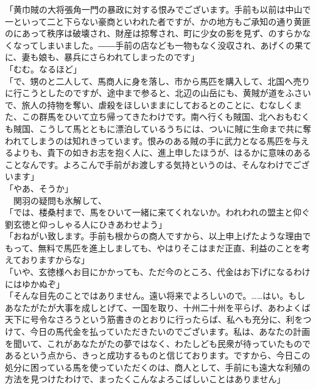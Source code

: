 \documentclass[
  paper=a5,
  fontsize=10pt,
  jafontsize=9.5pt,
  tate,                  %
  open_bracket_pos=nibu, %
]{jlreq}
\begin{document}
「黄巾賊の大将張角一門の暴政に対する恨みでございます。手前も以前は中山で一といって二と下らない豪商といわれた者ですが、かの地方もご承知の通り黄匪のにあって秩序は破壊され、財産は掠奪され、町に少女の影を見ず、のすらかなくなってしまいました。――手前の店なども一物もなく没収され、あげくの果てに、妻も娘も、暴兵にさらわれてしまったのです」\\


「むむ。なるほど」\\


「で、甥のと二人して、馬商人に身を落し、市から馬匹を購入して、北国へ売りに行こうとしたのですが、途中まで参ると、北辺の山岳にも、黄賊が道をふさいで、旅人の持物を奪い、虐殺をほしいままにしておるとのことに、むなしくまた、この群馬をひいて立ち帰ってきたわけです。南へ行くも賊国、北へおもむくも賊国、こうして馬とともに漂泊しているうちには、ついに賊に生命まで共に奪われてしまうのは知れきっています。恨みのある賊の手に武力となる馬匹を与えるよりも、貴下の如きお志を抱く人に、進上申したほうが、はるかに意味のあることなんです。よろこんで手前がお渡しする気持というのは、そんなわけでございます」\\


「やあ、そうか」\\


　関羽の疑問も氷解して、\\


「では、楼桑村まで、馬をひいて一緒に来てくれないか。われわれの盟主と仰ぐ劉玄徳と仰っしゃる人にひきあわせよう」\\


「おねがい致します。手前も根からの商人ですから、以上申上げたような理由でもって、無料で馬匹を進上しましても、やはりそこはまだ正直、利益のことを考えておりますからな」\\


「いや、玄徳様へお目にかかっても、ただ今のところ、代金はお下げになるわけにはゆかぬぞ」\\


「そんな目先のことではありません。遠い将来でよろしいので。……はい。もしあなたがたが大事を成しとげて、一国を取り、十州二十州を平らげ、あわよくば天下に号令なさろうという筋書きのとおりに行ったらば、私へも充分に、利をつけて、今日の馬代金を払っていただきたいのでございます。私は、あなたの計画を聞いて、これがあなたがたの夢ではなく、わたしども民衆が待っていたものであるという点から、きっと成功するものと信じております。ですから、今日この処分に困っている馬を使っていただくのは、商人として、手前にも遠大な利殖の方法を見つけたわけで、まったくこんなよろこばしいことはありません」\\
\end{document}

